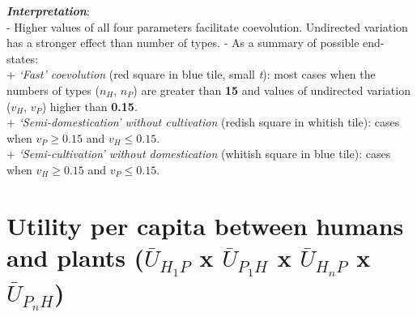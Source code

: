 \documentclass[]{book}
\begin{document}
\textbf{\emph{Interpretation}}:\\
- Higher values of all four parameters facilitate coevolution. Undirected variation has a stronger effect than number of types.
- As a summary of possible end-states:\\
+ \emph{`Fast' coevolution} (red square in blue tile, small \emph{t}): most cases when the numbers of types (\(n_{H}\), \(n_{P}\)) are greater than \textbf{15} and values of undirected variation (\(v_{H}\), \(v_{P}\)) higher than \textbf{0.15}.\\
+ \emph{`Semi-domestication' without cultivation} (redish square in whitish tile): cases when \(v_{P}\geq 0.15\) and \(v_{H}\leq 0.15\).\\
+ \emph{`Semi-cultivation' without domestication} (whitish square in blue tile): cases when \(v_{H}\geq 0.15\) and \(v_{P}\leq 0.15\).

\newpage

\hypertarget{utility-per-capita-between-humans-and-plants-baru_h_1p-x-baru_p_1h-x-baru_h_np-x-baru_p_nh}{%
\section{\texorpdfstring{Utility per capita between humans and plants (\(\bar{U}_{H_{1}P}\) x \(\bar{U}_{P_{1}H}\) x \(\bar{U}_{H_{n}P}\) x \(\bar{U}_{P_{n}H}\))}{Utility per capita between humans and plants (\textbackslash{}bar\{U\}\_\{H\_\{1\}P\} x \textbackslash{}bar\{U\}\_\{P\_\{1\}H\} x \textbackslash{}bar\{U\}\_\{H\_\{n\}P\} x \textbackslash{}bar\{U\}\_\{P\_\{n\}H\})}}\label{utility-per-capita-between-humans-and-plants-baru_h_1p-x-baru_p_1h-x-baru_h_np-x-baru_p_nh}}

\end{document}
